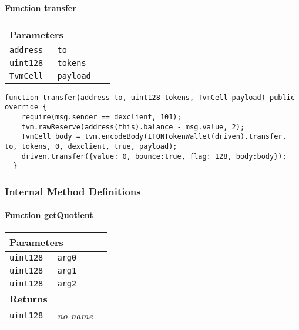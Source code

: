 \paragraph{Function transfer}


\ifsoltables
\noindent\begin{tabular}{|l|l|p{5cm}|}\hline
\multicolumn{3}{|l|}{\bf Parameters}\\\hline
\tt address & \tt to &\\\hline
\tt uint128 & \tt tokens &\\\hline
\tt TvmCell & \tt payload &\\\hline
\end{tabular}
\fi

\vspace{2cm}

\begin{lstlisting}[firstnumber=108]
  function transfer(address to, uint128 tokens, TvmCell payload) public override {
    require(msg.sender == dexclient, 101);
    tvm.rawReserve(address(this).balance - msg.value, 2);
    TvmCell body = tvm.encodeBody(ITONTokenWallet(driven).transfer, to, tokens, 0, dexclient, true, payload);
    driven.transfer({value: 0, bounce:true, flag: 128, body:body});
  }
\end{lstlisting}

\subsubsection{Internal Method Definitions}


\paragraph{Function getQuotient}


\ifsoltables
\noindent\begin{tabular}{|l|l|p{5cm}|}\hline
\multicolumn{3}{|l|}{\bf Parameters}\\\hline
\tt uint128 & \tt arg0 &\\\hline
\tt uint128 & \tt arg1 &\\\hline
\tt uint128 & \tt arg2 &\\\hline
\multicolumn{3}{|l|}{\bf Returns}\\\hline
\tt uint128 & {\em no name} &\\\hline
\end{tabular}
\fi

\vspace{2cm}

